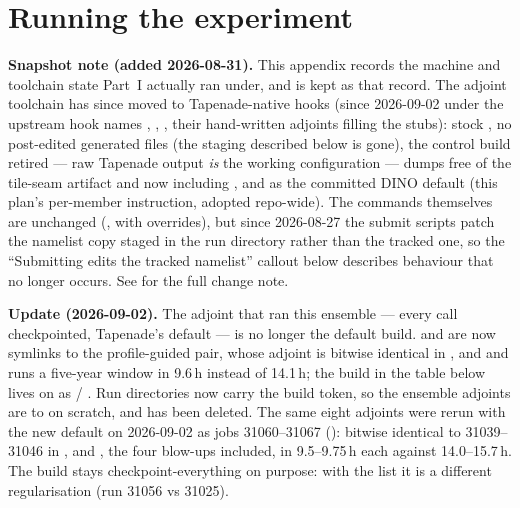 \section{Running the experiment}

\begin{callout}
\textbf{Snapshot note (added 2026-08-31).} This appendix records the machine
and toolchain state Part~I actually ran under, and is kept as that record. The
adjoint toolchain has since moved to Tapenade-native hooks (since 2026-09-02
under the upstream hook names , ,
, their hand-written adjoints filling the
 stubs): stock , no post-edited
generated files (the
 staging described below is gone), the
 control build retired --- raw Tapenade output \emph{is}
the working configuration ---  dumps free of the tile-seam
artifact and now including , and 
as the committed DINO default (this plan's per-member instruction, adopted
repo-wide). The commands themselves are unchanged
(,  with 
overrides), but since 2026-08-27 the submit scripts patch the namelist copy
staged in the run directory rather than the tracked one, so the ``Submitting
edits the tracked namelist'' callout below describes behaviour that no longer
occurs. See  for the full change
note.

\textbf{Update (2026-09-02).} The adjoint that ran this ensemble --- every
call checkpointed, Tapenade's default --- is no longer the default build.
 and  are now symlinks to the
profile-guided  pair, whose adjoint is bitwise identical in
,  and  and runs a five-year window in
9.6\,h instead of 14.1\,h; the build in the table below lives on as
 / . Run
directories now carry the build token, so the ensemble adjoints are
 to
 on scratch, and
 has been deleted. The same eight
adjoints were rerun with the new default on 2026-09-02 as jobs 31060--31067
(): bitwise identical
to 31039--31046 in ,  and , the four
blow-ups included, in 9.5--9.75\,h each against 14.0--15.7\,h. The
 build stays checkpoint-everything on purpose: with the
list it is a different regularisation (run 31056 vs 31025).
\end{callout}

